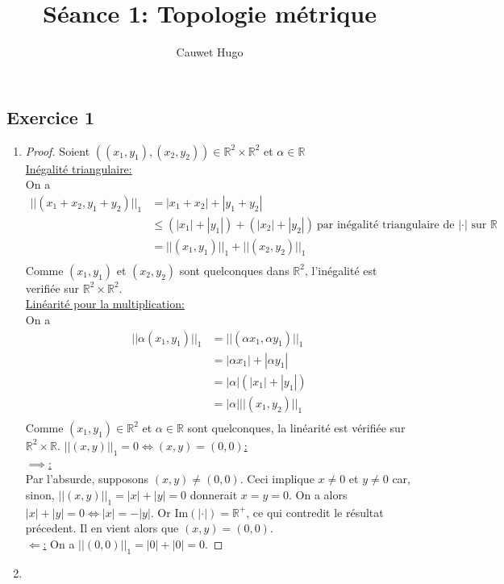 \documentclass[12pt,a4paper]{scrartcl}
\title{Séance 1: Topologie métrique}
\author{Cauwet Hugo}
\date{}
\newcommand{\R}{\mathbb{R}}
\begin{document}
\maketitle
\subsection*{Exercice 1}
\begin{enumerate}
 	\item 
	\begin{proof} Soient $((x_1,y_1),(x_2,y_2)) \in \R^2 \times \R^2$ et $\alpha \in \R$\\
		\underline{Inégalité triangulaire:}\\
			On a 
			\begin{align*}
			||(x_1+x_2,y_1+y_2)||_1 &= |x_1+x_2|+|y_1+y_2|\\
						&\leq (|x_1|+|y_1|)+(|x_2|+|y_2|)\ \text{par inégalité triangulaire de $|\cdot|$ sur $\R$}\\
						&= ||(x_1,y_1)||_1+||(x_2,y_2)||_1\\
			\end{align*}
			Comme $(x_1,y_1)$ et $(x_2,y_2)$ sont quelconques dans $\R^2$, l'inégalité est verifiée sur $\R^2 \times \R^2$.\\ 
		\underline{Linéarité pour la multiplication:}\\
			On a
			\begin{align*}
			||\alpha(x_1,y_1)||_1 &= ||(\alpha x_1,\alpha y_1)||_1\\
					      &= |\alpha x_1|+|\alpha y_1|\\
					      &= |\alpha|(|x_1|+|y_1|)\\
					      &= |\alpha| ||(x_1,y_2)||_1\\
			\end{align*}
			Comme $(x_1,y_1) \in \R^2$ et $\alpha \in \R$ sont quelconques, la linéarité est vérifiée sur $\R^2 \times \R$.
		\underline{$||(x,y)||_1=0 \iff (x,y)=(0,0)$:}\\
			\underline{$\implies$:}\\
				Par l'absurde, supposons $(x,y) \neq (0,0)$. Ceci implique $x \neq 0$ et $y \neq 0$ car, sinon, $||(x,y)||_1=|x|+|y|=0$ donnerait $x=y=0$.
				On a alors $|x|+|y|=0 \iff |x|=-|y|$. Or $\text{Im}(|\cdot|) = \R^+$, ce qui contredit le résultat précedent.
				Il en vient alors que $(x,y) = (0,0)$.\\
			\underline{$\Longleftarrow$:}
				On a $||(0,0)||_1=|0|+|0|=0$.
	\end{proof}
	\item

\end{enumerate}
\end{document}
